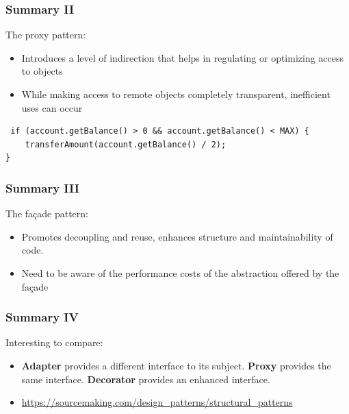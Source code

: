 \documentclass{beamer}
\begin{document}
\begin{frame}[fragile]
\frametitle{Summary II}
 The proxy pattern:
 \begin{itemize}
\item Introduces a level of indirection that helps in regulating or optimizing access to objects
\item While making access to remote objects completely transparent, inefficient uses can occur
 \end{itemize}
 \begin{lstlisting}
 if (account.getBalance() > 0 && account.getBalance() < MAX) {
    transferAmount(account.getBalance() / 2);
}
 \end{lstlisting}
\end{frame}

\begin{frame}[fragile]
\frametitle{Summary III}
 The fa\c{c}ade pattern:
\begin{itemize}
  \item Promotes decoupling and reuse, enhances structure and maintainability of code.
  \item Need to be aware of the performance costs of the abstraction offered by the fa\c{c}ade
  \end{itemize}
\end{frame}

\begin{frame}[fragile]
\frametitle{Summary IV}
Interesting to compare:
\begin{itemize}
\item \textbf{Adapter} provides a different interface to its subject. \textbf{Proxy} provides the same interface. \textbf{Decorator} provides an enhanced interface.

\item \url{https://sourcemaking.com/design_patterns/structural_patterns}
\end{itemize}
\end{frame}
\end{document}
